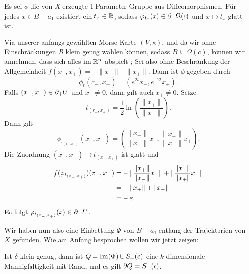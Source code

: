 \begin{bigproof}
    \begin{claim}
        Es sei $\phi$ die von $X$ erzeugte 1-Parameter Gruppe aus Diffeomorphismen. Für jedes 
        $x \in B - a_1$ existiert ein $t_x \in { \mathbb R }$, sodass $\varphi_{t_x} (x) \in { \partial }_- \Omega (c)$
        und $x \mapsto t_x$ glatt ist.
    \end{claim}

    \begin{smallproof}
        Via unserer anfangs gewählten Morse Karte $(V, \kappa)$, und da wir ohne Einschränkungen $B$ 
        klein genug wählen können, sodass $B \subseteq \Omega (c)$, können wir annehmen, dass sich 
        alles im ${ \mathbb R }^n$ abspielt ; Sei also ohne Beschränkung der Allgemeinheit 
        $f(x_-, x_+) = - \|x_-\| + \|x_+\|$. Dann ist $\phi$ gegeben durch 
        \[ \phi_t(x_-, x_+) = (e^{2t}x_-, e^{-2t}x_+) . \]
        Falls $(x_-, x_+) \in { \partial }_+ U$ und $x_- \neq 0$, dann gilt auch $x_+ \neq 0$. Setze
        \[ t_{(x_-, x_+)} = \frac{1}{2} \ln \left( \frac{\| x_+ \|}{\| x_- \|} \right) . \]
        Dann gilt
        \[ \phi_{t_{(x_-, x_+)}} (x_-, x_+) = 
            \left( \frac{\| x_+ \|}{\| x_- \|} x_-, \frac{\| x_- \|}{\| x_+ \|} x_+ \right) . \]
        Die Zuordnung $(x_-, x_+) \mapsto t_{(x_-, x_+)}$ ist glatt und 
        \begin{align*}
            f(\varphi_{t_{(x_-, x_+)}})(x_-, x_+) = & - \| \frac{\| x_+ \|}{\| x_- \|} x_- \|
                +  \| \frac{\| x_- \|}{\| x_+ \|} x_+ \| \\
                = & - \| x_+ \| + \| x_- \| \\
                = & - \varepsilon .
        \end{align*}
        Es folgt $\varphi_{t_{(x_-, x_+)}} (x) \in { \partial }_- U$.
    \end{smallproof}

    Wir haben nun also eine Einbettung $\Phi$ von $B - a_1$ entlang der Trajektorien von $X$ gefunden.
    Wie am Anfang besprochen wollen wir jetzt zeigen:

    \begin{claim}
        Ist $\delta$ klein genug, dann ist $Q = { \operatorname{Im} } (\Phi) \cup S_+ (c)$ eine $k$ dimensionale 
        Mannigfaltigkeit mit Rand, und es gilt ${ \partial } Q = S_- (c)$.
    \end{claim}


\end{bigproof}
